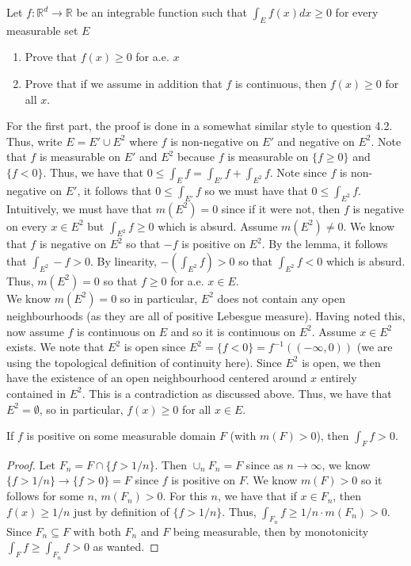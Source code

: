 \documentclass[12pt]{article}
\newcommand{\R}{\mathbb{R}}
\newenvironment{lemma}[2][Lemma]{\begin{trivlist}
\item[\hskip \labelsep {\bfseries #1}\hskip \labelsep {\bfseries #2.}]}{\end{trivlist}}
\newenvironment{solution}[2][Solution]{\begin{trivlist}
\item[\hskip \labelsep {\bfseries #1}]}{\end{trivlist}}
\newenvironment{problem}[2][Problem]{\begin{trivlist}
\item[\hskip \labelsep {\bfseries #1}\hskip \labelsep {\bfseries #2.}]}{\end{trivlist}}
\begin{document}
\begin{problem}{6}
    Let $f:\R^d\to\R$ be an integrable function such that $\int_E f(x)dx \geq 0$ for every measurable set $E$
    \begin{enumerate}
        \item Prove that $f(x)\geq 0$ for a.e. $x$
        \item Prove that if we assume in addition that $f$ is continuous, then $f(x)\geq 0$ for all $x$.
    \end{enumerate}
\end{problem}

\begin{solution}
    FFor the first part, the proof is done in a somewhat similar style to question 4.2. Thus, write $E = E' \cup E^2$ where
    $f$ is non-negative on $E'$ and negative on $E^2$. Note that $f$ is measurable on $E'$ and $E^2$ because $f$ is measurable on
    $\{f \geq 0\}$ and $\{f < 0\}$. Thus, we have that $0 \leq \int_E f = \int_{E'} f + \int_{E^2} f$. Note since $f$ is non-negative
    on $E'$, it follows that $0\leq \int_{E'} f$ so we must have that $0\leq \int_{E^2} f$. Intuitively, we must have that
    $m(E^2) = 0$ since if it were not, then $f$ is negative on every $x\in E^2$ but $\int_{E^2} f\geq 0$ which is absurd.
    Assume $m(E^2)\neq 0$. We know that $f$ is negative on $E^2$ so that $-f$ is positive on $E^2$. By the lemma, it follows
    that $\int_{E^2} -f > 0$. By linearity, $-(\int_{E^2} f) > 0$ so that $\int_{E^2} f < 0$ which is absurd. Thus, $m(E^2) = 0$
    so that $f\geq 0$ for a.e. $x\in E$.\\

    We know $m(E^2) = 0$ so in particular, $E^2$ does not contain any open neighbourhoods (as they are all of positive Lebesgue measure).
    Having noted this, now assume $f$ is continuous on $E$ and so it is continuous on $E^2$. Assume $x\in E^2$ exists. We note
    that $E^2$ is open since $E^2 = \{f < 0\} = f^{-1}((-\infty,0))$ (we are using the topological definition of continuity here).
    Since $E^2$ is open, we then have the existence of an open neighbourhood centered around $x$ entirely contained in $E^2$. This
    is a contradiction as discussed above. Thus, we have that $E^2 = \emptyset$, so in particular, $f(x)\geq 0$ for all $x\in E$.
\end{solution}

\begin{lemma}
    IIf $f$ is positive on some measurable domain $F$ (with $m(F)>0$), then $\int_F f > 0$.
\end{lemma}
\begin{proof}
    Let $F_n = F \cap \{f > 1/n\}$. Then $\cup_n F_n = F$ since as $n\to\infty$, we know $\{f > 1/n\}\to \{f>0\} = F$
    since $f$ is positive on $F$. We know $m(F)>0$ so it follows for some $n$, $m(F_n)>0$. For this $n$, we have that
    if $x\in F_n$, then $f(x) \geq 1/n$ just by definition of $\{f > 1/n\}$. Thus, $\int_{F_n} f \geq 1/n\cdot m(F_n) > 0$.
    Since $F_n\subseteq F$ with both $F_n$ and $F$ being measurable, then by monotonicity $\int_F f \geq \int_{F_n} f > 0$ as wanted.
\end{proof}
\end{document}
